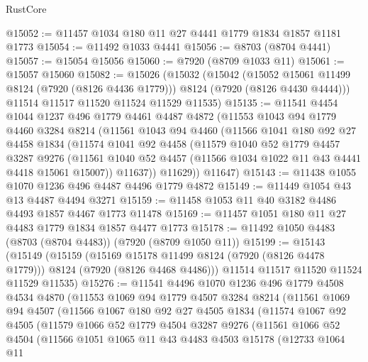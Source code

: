 \begin{lexlean}{RustCore}
\begin{coremodule}
@15052 := @11457 @1034 @180 @11 @27 @4441 @1779 @1834 @1857 @1181 @1773
@15054 := @11492 @1033 @4441
@15056 := @8703 (@8704 @4441)
@15057 := @15054 @15056
@15060 := @7920 (@8709 @1033 @11)
@15061 := @15057 @15060
@15082 := @15026
    (@15032
      (@15042
        (@15052 @15061 @11499 @8124 (@7920 (@8126 @4436 @1779)))
        @8124
        (@7920 (@8126 @4430 @4444)))
      @11514
      @11517
      @11520
      @11524
      @11529
      @11535)
@15135 := @11541
    @4454
    @1044
    @1237
    @496
    @1779
    @4461
    @4487
    @4872
    (@11553
      @1043
      @94
      @1779
      @4460
      @3284
      @8214
      (@11561
        @1043
        @94
        @4460
        (@11566
          @1041
          @180
          @92
          @27
          @4458
          @1834
          (@11574
            @1041
            @92
            @4458
            (@11579
              @1040
              @52
              @1779
              @4457
              @3287
              @9276
              (@11561 @1040 @52 @4457 (@11566 @1034 @1022 @11 @43 @4441 @4418 @15061 @15007))
              @11637))
          @11629))
      @11647)
@15143 := @11438 @1055 @1070 @1236 @496 @4487 @4496 @1779 @4872
@15149 := @11449 @1054 @43 @13 @4487 @4494 @3271
@15159 := @11458 @1053 @11 @40 @3182 @4486 @4493 @1857 @4467 @1773 @11478
@15169 := @11457 @1051 @180 @11 @27 @4483 @1779 @1834 @1857 @4477 @1773
@15178 := @11492 @1050 @4483 (@8703 (@8704 @4483)) (@7920 (@8709 @1050 @11))
@15199 := @15143
    (@15149
      (@15159
        (@15169 @15178 @11499 @8124 (@7920 (@8126 @4478 @1779)))
        @8124
        (@7920 (@8126 @4468 @4486)))
      @11514
      @11517
      @11520
      @11524
      @11529
      @11535)
@15276 := @11541
    @4496
    @1070
    @1236
    @496
    @1779
    @4508
    @4534
    @4870
    (@11553
      @1069
      @94
      @1779
      @4507
      @3284
      @8214
      (@11561
        @1069
        @94
        @4507
        (@11566
          @1067
          @180
          @92
          @27
          @4505
          @1834
          (@11574
            @1067
            @92
            @4505
            (@11579
              @1066
              @52
              @1779
              @4504
              @3287
              @9276
              (@11561
                @1066
                @52
                @4504
                (@11566
                  @1051
                  @1065
                  @11
                  @43
                  @4483
                  @4503
                  @15178
                  (@12733
                    @1064
                    @11

\end{coremodule}
\end{lexlean}
